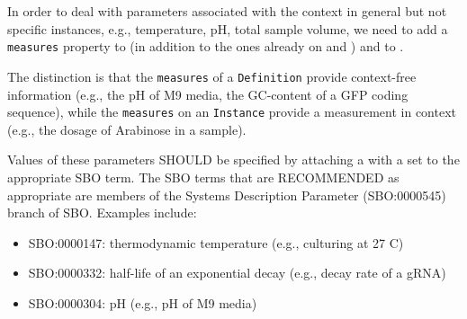 In order to deal with parameters associated with the context in general but not specific instances, e.g., temperature, pH, total sample volume, we need to add a \texttt{measures} property to  (in addition to the ones already on  and ) and to .

The distinction is that the \texttt{measures} of a \texttt{Definition} provide context-free information (e.g., the pH of M9 media, the GC-content of a GFP coding sequence), while the \texttt{measures} on an \texttt{Instance} provide a measurement in context (e.g., the dosage of Arabinose in a sample).

Values of these parameters SHOULD be specified by attaching a  with a  set to the appropriate SBO term. The SBO terms that are RECOMMENDED as appropriate are members of the Systems Description Parameter (SBO:0000545) branch of SBO. Examples include:
\begin{itemize}
\item SBO:0000147: thermodynamic temperature (e.g., culturing at 27 C)
\item SBO:0000332: half-life of an exponential decay (e.g., decay rate of a gRNA)
\item SBO:0000304: pH (e.g., pH of M9 media)
\end{itemize}

